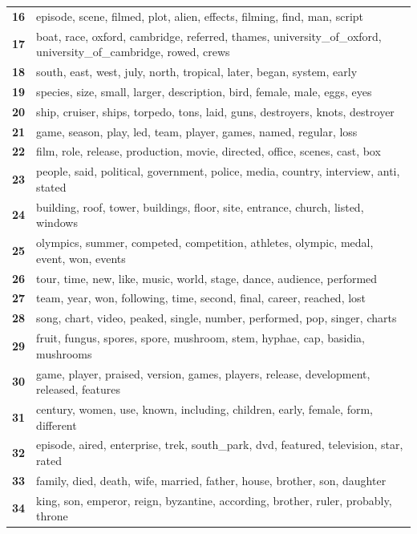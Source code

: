 \begin{table}[htpb]
\begin{tabularx}{\textwidth}{@{}l X@{}}
        \textbf{16} & episode, scene, filmed, plot, alien, effects, filming, find, man, script \\
        \textbf{17} & boat, race, oxford, cambridge, referred, thames, university\_of\_oxford, university\_of\_cambridge, rowed, crews \\
        \textbf{18} & south, east, west, july, north, tropical, later, began, system, early \\
        \textbf{19} & species, size, small, larger, description, bird, female, male, eggs, eyes \\
        \textbf{20} & ship, cruiser, ships, torpedo, tons, laid, guns, destroyers, knots, destroyer \\
        \textbf{21} & game, season, play, led, team, player, games, named, regular, loss \\
        \textbf{22} & film, role, release, production, movie, directed, office, scenes, cast, box \\
        \textbf{23} & people, said, political, government, police, media, country, interview, anti, stated \\
        \textbf{24} & building, roof, tower, buildings, floor, site, entrance, church, listed, windows \\
        \textbf{25} & olympics, summer, competed, competition, athletes, olympic, medal, event, won, events \\
        \textbf{26} & tour, time, new, like, music, world, stage, dance, audience, performed \\
        \textbf{27} & team, year, won, following, time, second, final, career, reached, lost \\
        \textbf{28} & song, chart, video, peaked, single, number, performed, pop, singer, charts \\
        \textbf{29} & fruit, fungus, spores, spore, mushroom, stem, hyphae, cap, basidia, mushrooms \\
        \textbf{30} & game, player, praised, version, games, players, release, development, released, features \\
        \textbf{31} & century, women, use, known, including, children, early, female, form, different \\
        \textbf{32} & episode, aired, enterprise, trek, south\_park, dvd, featured, television, star, rated \\
        \textbf{33} & family, died, death, wife, married, father, house, brother, son, daughter \\
        \textbf{34} & king, son, emperor, reign, byzantine, according, brother, ruler, probably, throne \\

\end{tabularx}
\end{table}
